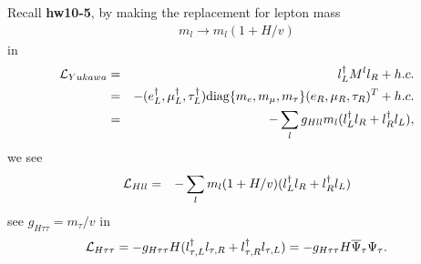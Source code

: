 \documentclass[11pt]{article}
\begin{document}
\section{ }
Recall {\bf hw10-5}, by making the replacement for lepton mass
\begin{eqnarray}
    m_l \to m_l (1+H/v)
  \end{eqnarray}
in
\begin{eqnarray}
    {\cal L}_{Yukawa} &=& l_L^\dagger M^l l_R + h.c. \\
    &=& - (e_L^\dagger, \mu_L^\dagger, \tau_L^\dagger) {\rm diag}\{m_e,m_\mu,m_\tau\} (e_R,\mu_R,\tau_R)^T
    +
    h.c. \\
    &=& - \sum_l g_{Hll} m_l (l_L^\dagger l_R + l_R^\dagger l_L),
  \end{eqnarray}
  we see
  \begin{eqnarray}
    {\cal L}_{Hll} &=& - \sum_l  m_l (1+H/v) (l_L^\dagger l_R + l_R^\dagger l_L)
 \end{eqnarray}
see $g_{H\tau\tau}=m_\tau/v$ in 
\begin{eqnarray}
    {\cal L}_{H\tau\tau} = - g_{H\tau\tau} H (l_{\tau,L}^\dagger l_{\tau,R} + l_{\tau,R}^\dagger l_{\tau,L})=- g_{H\tau\tau} H {\overline \Psi}_\tau \Psi_\tau.
\end{eqnarray}
\end{document}
